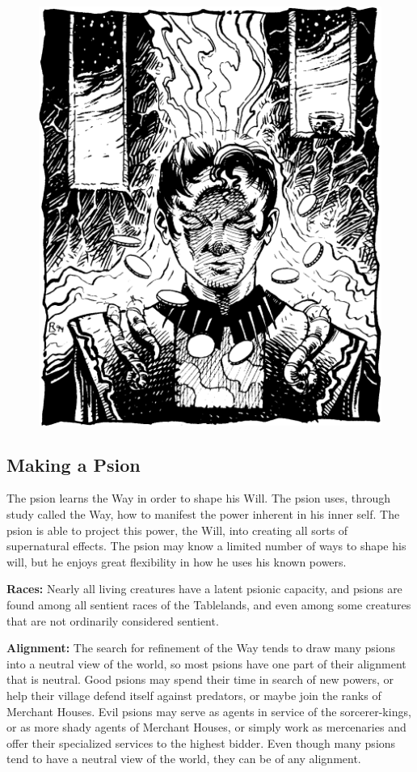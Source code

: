 \begin{figure}[t!]
\centering
\includegraphics[width=\columnwidth]{images/psion-2.png}
\WOTC
\end{figure}

\subsection{Making a Psion}
The psion learns the Way in order to shape his Will. The psion uses, through study called the Way, how to manifest the power inherent in his inner self. The psion is able to project this power, the Will, into creating all sorts of supernatural effects. The psion may know a limited number of ways to shape his will, but he enjoys great flexibility in how he uses his known powers.

\textbf{Races:} Nearly all living creatures have a latent psionic capacity, and psions are found among all sentient races of the Tablelands, and even among some creatures that are not ordinarily considered sentient.

\textbf{Alignment:} The search for refinement of the Way tends to draw many psions into a neutral view of the world, so most psions have one part of their alignment that is neutral. Good psions may spend their time in search of new powers, or help their village defend itself against predators, or maybe join the ranks of Merchant Houses. Evil psions may serve as agents in service of the sorcerer-kings, or as more shady agents of Merchant Houses, or simply work as mercenaries and offer their specialized services to the highest bidder. Even though many psions tend to have a neutral view of the world, they can be of any alignment.


